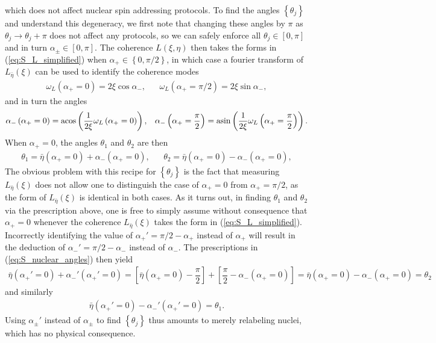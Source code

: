 \documentclass[twocolumn]{revtex4-1}
\newcommand{\f}[2]{\dfrac{#1}{#2}} %
\newcommand{\p}[1]{\left(#1\right)} %
\renewcommand{\sp}[1]{\left[#1\right]} %
\renewcommand{\set}[1]{\left\{#1\right\}} %
\begin{document}
which does not affect nuclear spin addressing protocols. To find the
angles $\set{\theta_j}$ and understand this degeneracy, we first note
that changing these angles by $\pi$ as $\theta_j\to\theta_j+\pi$ does
not affect any protocols, so we can safely enforce all
$\theta_j\in\sp{0,\pi}$ and in turn $\alpha_\pm\in\sp{0,\pi}$. The
coherence $L\p{\xi,\eta}$ then takes the forms in
(\ref{eq:S_L_simplified}) when $\alpha_+\in\set{0,\pi/2}$, in which
case a fourier transform of $L_{\bar\eta}\p\xi$ can be used to
identify the coherence modes
\begin{align}
  \omega_L\p{\alpha_+=0}=2\xi\cos\alpha_-,
  && \omega_L\p{\alpha_+=\pi/2}=2\xi\sin\alpha_-,
\end{align}
and in turn the angles
\begin{align}
  \alpha_-\p{\alpha_+=0} = \acos\p{\f1{2\xi}\omega_L\p{\alpha_+=0}},
  && \alpha_-\p{\alpha_+=\f\pi2}
     = \asin\p{\f1{2\xi}\omega_L\p{\alpha_+=\f\pi2}}.
\end{align}
When $\alpha_+=0$, the angles $\theta_1$ and $\theta_2$ are then
\begin{align}
  \label{eq:S_nuclear_angles}
  \theta_1 = \bar\eta\p{\alpha_+=0} + \alpha_-\p{\alpha_+=0},
  && \theta_2 = \bar\eta\p{\alpha_+=0} - \alpha_-\p{\alpha_+=0},
\end{align}
The obvious problem with this recipe for $\set{\theta_j}$ is the fact
that measuring $L_{\bar\eta}\p\xi$ does not allow one to distinguish
the case of $\alpha_+=0$ from $\alpha_+=\pi/2$, as the form of
$L_{\bar\eta}\p\xi$ is identical in both cases. As it turns out, in
finding $\theta_1$ and $\theta_2$ via the prescription above, one is
free to simply assume without consequence that $\alpha_+=0$ whenever
the coherence $L_{\bar\eta}\p\xi$ takes the form in
(\ref{eq:S_L_simplified}). Incorrectly identifying the value of
$\alpha_+'=\pi/2-\alpha_+$ instead of $\alpha_+$ will result in the
deduction of $\alpha_-'=\pi/2-\alpha_-$ instead of $\alpha_-$. The
prescriptions in (\ref{eq:S_nuclear_angles}) then yield
\begin{align}
  \bar\eta\p{\alpha_+'=0} + \alpha_-'\p{\alpha_+'=0}
  = \sp{\bar\eta\p{\alpha_+=0} - \f\pi2}
  + \sp{\f\pi2 - \alpha_-\p{\alpha_+=0}}
  = \bar\eta\p{\alpha_+=0} - \alpha_-\p{\alpha_+=0} = \theta_2
\end{align}
and similarly
\begin{align}
  \bar\eta\p{\alpha_+'=0} - \alpha_-'\p{\alpha_+'=0} = \theta_1.
\end{align}
Using $\alpha_\pm'$ instead of $\alpha_\pm$ to find $\set{\theta_j}$
thus amounts to merely relabeling nuclei, which has no physical
consequence.
\end{document}
